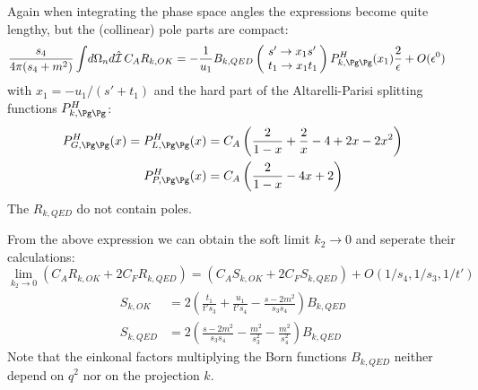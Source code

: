 Again when integrating the phase space angles the expressions become quite lengthy, but the (collinear) pole parts are compact:
\begin{align}
\frac{s_4}{4\pi(s_4+m^2)}\int\!d\Omega_n d\hat{\mathcal I}\,C_A R_{k,OK} &=-\frac 1 {u_1}B_{k,QED}\left(\!\begin{array}{l}s'\rightarrow x_1s'\\t_1\rightarrow x_1 t_1\end{array}\!\!\right) P^H_{k,\Pg\Pg}(x_1)\frac 2 \epsilon + O(\epsilon^0) \label{eq:ROKPoles}
\end{align}
with $x_1 = -u_1/(s'+t_1)$ and the hard part of the Altarelli-Parisi splitting functions $P^H_{k,\Pg\Pg}$\cite{Altarelli:1977zs,Vogelsang:1995vh}:
\begin{align}
P^H_{G,\Pg\Pg}(x) = P^H_{L,\Pg\Pg}(x) &= C_A\left(\frac 2 {1-x} + \frac 2 x - 4 + 2x - 2x^2\right)\\
P^H_{P,\Pg\Pg}(x) &= C_A\left(\frac 2 {1-x} - 4x + 2\right)
\end{align}
The $R_{k,QED}$ do not contain poles. 

From the above expression we can obtain the soft limit $k_2\rightarrow 0$ and seperate their calculations:
\begin{equation}
\lim_{k_2\rightarrow 0}\left(C_A R_{k,OK} + 2C_F R_{k,QED}\right) = \left(C_A S_{k,OK} + 2C_F S_{k,QED}\right) + O(1/s_4,1/s_3,1/t')
\end{equation}
\begin{align}
S_{k,OK}  &= 2\left(\frac{t_1}{t's_3} + \frac{u_1}{t's_4}-\frac{s-2m^2}{s_3s_4}\right)B_{k,QED}\\
S_{k,QED} &= 2\left(\frac{s-2m^2}{s_3s_4} - \frac{m^2}{s_3^2} - \frac{m^2}{s_4^2}\right)B_{k,QED}
\end{align}
Note that the einkonal factors multiplying the Born functions $B_{k,QED}$ neither depend on $q^2$ nor on the projection $k$. 
